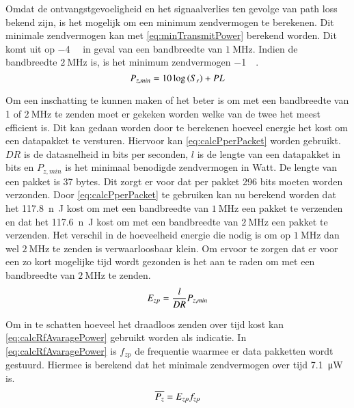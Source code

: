 Omdat de ontvangstgevoeligheid en het signaalverlies ten gevolge van path loss bekend zijn, is het mogelijk om een minimum zendvermogen te berekenen. Dit minimale zendvermogen kan met \cref{eq:minTransmitPower} berekend worden. Dit komt uit op \qty{-4}{\deci\belmilliwatt} in geval van een bandbreedte van $\SI{1}{\mega\hertz}$. Indien de bandbreedte $\SI{2}{\mega\hertz}$ is, is het minimum zendvermogen \qty{-1}{\deci\belmilliwatt}.
\begin{equation}\label{eq:minTransmitPower}
    P_{z,min}= 10\log\left(S_r\right) + PL
    \tagaddtext{[\si{\deci\belmilliwatt}]}
\end{equation}

Om een inschatting te kunnen maken of het beter is om met een bandbreedte van 1 of $\SI{2}{\mega\hertz}$ te zenden moet er gekeken worden welke van de twee het meest efficient is. Dit kan gedaan worden door te berekenen hoeveel energie het kost om een datapakket te versturen. Hiervoor kan \cref{eq:calcPperPacket} worden gebruikt. $DR$ is de datasnelheid in bits per seconden, $l$ is de lengte van een datapakket in bits en $P_{z,min}$ is het minimaal benodigde zendvermogen in Watt. De lengte van een pakket is 37 bytes. Dit zorgt er voor dat per pakket 296 bits moeten worden verzonden. Door \cref{eq:calcPperPacket} te gebruiken kan nu berekend worden dat het \qty{117.8}{n\joule} kost om met een bandbreedte van $\SI{1}{\mega\hertz}$ een pakket te verzenden en dat het \qty{117.6}{n\joule} kost om met een bandbreedte van $\SI{2}{\mega\hertz}$ een pakket te verzenden. Het verschil in de hoeveelheid energie die nodig is om op $\SI{1}{\mega\hertz}$ dan wel $\SI{2}{\mega\hertz}$ te zenden is verwaarloosbaar klein. Om ervoor te zorgen dat er voor een zo kort mogelijke tijd wordt gezonden is het aan te raden om met een bandbreedte van $\SI{2}{\mega\hertz}$ te zenden.
\begin{equation}\label{eq:calcPperPacket}
    E_{zp}=\frac{l}{DR}P_{z,min}
    \tagaddtext{[\si{\joule}]}
\end{equation}

Om in te schatten hoeveel het draadloos zenden over tijd kost kan \cref{eq:calcRfAvaragePower} gebruikt worden als indicatie. In \cref{eq:calcRfAvaragePower} is $f_{zp}$ de frequentie waarmee er data pakketten wordt gestuurd. Hiermee is berekend dat het minimale zendvermogen over tijd \qty{7.1}{\micro\watt} is.
\begin{equation}\label{eq:calcRfAvaragePower}
    \overline{P_{z}}=E_{zp}f_{zp}
    \tagaddtext{[\si{\watt}]}
\end{equation}




